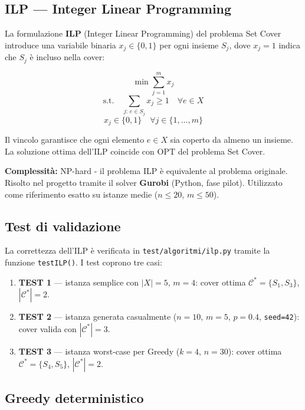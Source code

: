 \documentclass[12pt, a4paper]{article}
\begin{document}
\subsection{ILP — Integer Linear Programming}

La formulazione \textbf{ILP} (Integer Linear Programming) del problema Set Cover
introduce una variabile binaria $x_j \in \{0, 1\}$ per ogni insieme $S_j$,
dove $x_j = 1$ indica che $S_j$ è incluso nella cover:

$$\min \sum_{j=1}^{m} x_j$$
$$\text{s.t.} \quad \sum_{j:\, e \in S_j} x_j \geq 1 \quad \forall e \in X$$
$$x_j \in \{0, 1\} \quad \forall j \in \{1, \ldots, m\}$$

Il vincolo garantisce che ogni elemento $e \in X$ sia coperto da almeno un insieme.
La soluzione ottima dell'ILP coincide con $\mathrm{OPT}$ del problema Set Cover.

\textbf{Complessità:} NP-hard - il problema ILP è equivalente 
al problema originale. Risolto nel progetto tramite il solver \textbf{Gurobi} 
(Python, fase pilot). Utilizzato come riferimento esatto su istanze medie 
($n \leq 20$, $m \leq 50$).

\subsection*{Test di validazione}

La correttezza dell'ILP è verificata in \texttt{test/algoritmi/ilp.py} 
tramite la funzione \texttt{testILP()}. I test coprono tre casi:

\begin{enumerate}
    \item \textbf{TEST 1} — istanza semplice con $|X|=5$, $m=4$: 
    cover ottima $\mathcal{C}^* = \{S_1, S_3\}$, $|\mathcal{C}^*| = 2$.

    \item \textbf{TEST 2} — istanza generata casualmente ($n=10$, $m=5$, 
    $p=0.4$, \texttt{seed=42}): cover valida con $|\mathcal{C}^*| = 3$.

    \item \textbf{TEST 3} — istanza worst-case per Greedy ($k=4$, $n=30$): 
    cover ottima $\mathcal{C}^* = \{S_4, S_5\}$, $|\mathcal{C}^*| = 2$.
\end{enumerate}

\subsection{Greedy deterministico}
\end{document}
